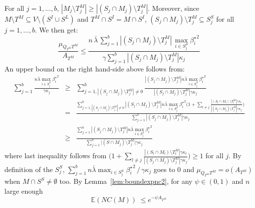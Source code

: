 \documentclass[aos]{imsart}
\theoremstyle{plain}
\newcommand{\E}{\mathbb{E}}
\begin{document}
\begin{supplement}
For all $j=1,\ldots,b$, $|M_j \setminus T^M_j| \geq |(S_j\cap M_j )\setminus T^M_j|$. Moreover, since  $M\setminus T^M\subseteq V\setminus (S^I \cup S^L)$ and $T^M\cap S^I=M\cap S^I$, $(S_j\cap M_j )\setminus T^M_j \subseteq S^S_j$ for all $j=1,\ldots,b$. We then get:
$$\frac{\mu_{Q_{T^M} T^M}}{ A_{T^M}} \leq \frac{n\,\bar{\lambda}\,\sum_{j=1}^b|(S_j\cap M_j )\setminus T^M_j|\,\max_{i\in S^S_j}{\beta_{i}^{\star}}^2}{ \gamma\sum_{j=1}^b|(S_j\cap M_j ) \setminus T^M_j|\kappa_j}$$
An upper bound on the right hand-side above follows from:
\begin{eqnarray*}
    \sum_{j=1}^b\frac{n\bar{\lambda}\max_{i\in S^S_j}{\beta_i^{\star}}^2}{\gamma\kappa_j}
    &\geq &\sum_{j=1,|(S_j\cap M_j )\setminus T^M_j|\neq 0}^b\frac{|(S_j\cap M_j )\setminus T^M_j|n\bar{\lambda}\max_{i\in S^S_j}{\beta_i^{\star}}^2}{|(S_j\cap M_j )\setminus T^M_j|\gamma\kappa_j} \\
    &=& \frac{\sum_{j=1,|(S_j\cap M_j )\setminus T^M_j|\neq 0 }^b|(S_j\cap M_j )\setminus T^M_j|n\bar{\lambda}\max_{i\in S^S_j}{\beta_i^{\star}}^2\Big(1+\sum_{l\neq j}\frac{|(S_l\cap M_l)\setminus T^M_l|\gamma\kappa_l}{|(S_j\cap M_j )\setminus T^M_j|\gamma\kappa_j}\Big)}{\sum_{j=1}^b|(S_j\cap M_j )\setminus T^M_j|\gamma\kappa_j} \\
    &\geq & \frac{\sum_{j=1}^b|(S_j\cap M_j )\setminus T^M_j|n\bar{\lambda}\max_{i\in S^S_j}{\beta_i^{\star}}^2}{\sum_{j=1}^b \big|(S\cap M_j)\setminus T^M_j\big|\gamma\kappa_j} 
\end{eqnarray*}
where last inequality follows from $\Big(1+\sum_{l\neq j}\frac{|(S_l\cap M_l)\setminus T^M_l|\gamma\kappa_l}{|(S_j\cap M_j )\setminus T^M_j|\gamma\kappa_j}\Big)\geq 1$ for all $j$. By definition of the $S_j^S$, $\sum_{j=1}^b n\bar{\lambda}\max_{i\in S^S_j}{\beta_i^{\star}}^2\,/\,\gamma\kappa_j$ goes to 0 and $\mu_{Q_{T^M} T^M}=o(A_{T^M})$ when $M\cap S^S\neq\emptyset$ too. 
By Lemma~\ref{lem:boundexpnc2}, for any $\psi\in(0,1)$ and $n$ large enough
$$
\E(NC(M))\;\leq e^{-\psi A_{T^M}}
$$


\end{supplement}
\end{document}
